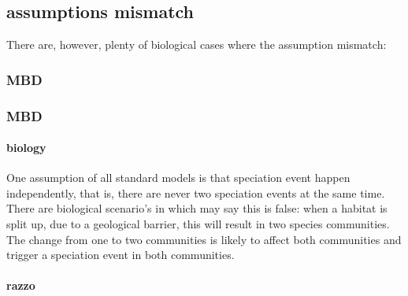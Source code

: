 \subsection{assumptions mismatch}

There are, however, plenty of biological cases where the assumption
mismatch: 

\subsubsection{MBD}

\subsubsection{MBD}

\paragraph{biology}

One assumption of all standard models is that speciation event happen
independently, that is, there are never two speciation events at the same time. 
There are biological scenario's in which may say
this is false: when a habitat is split up, 
due to a geological barrier, this will result in two 
species communities. The change from one to two communities is likely
to affect both communities and trigger a speciation event in both
communities. 


\paragraph{razzo}

